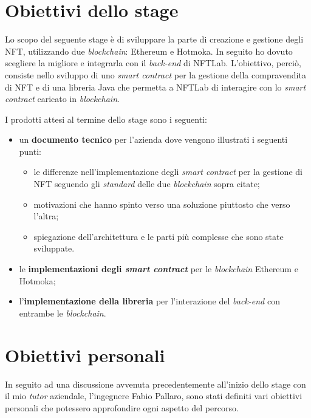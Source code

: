 
\section{Obiettivi dello stage}
Lo scopo del seguente stage è di sviluppare la parte di creazione e gestione degli NFT, utilizzando due \textit{blockchain}: Ethereum e Hotmoka. In seguito ho dovuto scegliere la migliore e integrarla con il \textit{back-end} di NFTLab. L'obiettivo, perciò, consiste nello sviluppo di uno \textit{smart contract} per la gestione della compravendita di NFT e di una libreria Java che permetta a NFTLab di interagire con lo \textit{smart contract} caricato in \textit{blockchain}. \newline

\noindent I prodotti attesi al termine dello stage sono i seguenti:
\begin{itemize}
  \item un \textbf{documento tecnico} per l'azienda dove vengono illustrati i seguenti punti:
  \begin{itemize}
    \item le differenze nell'implementazione degli \textit{smart contract} per la gestione di NFT seguendo gli \textit{standard} delle due \textit{blockchain} sopra citate;
    \item motivazioni che hanno spinto verso una soluzione piuttosto che verso l'altra;
    \item spiegazione dell'architettura e le parti più complesse che sono state sviluppate.
  \end{itemize}
  \item le \textbf{implementazioni degli \textit{smart contract}} per le \textit{blockchain} Ethereum e Hotmoka;
  \item l'\textbf{implementazione della libreria} per l'interazione del \textit{back-end} con entrambe le \textit{blockchain}.
\end{itemize}

\section{Obiettivi personali}
In seguito ad una discussione avvenuta precedentemente all'inizio dello stage con il mio \textit{tutor} aziendale, l'ingegnere Fabio Pallaro, sono stati definiti vari obiettivi personali che potessero approfondire ogni aspetto del percorso. \\

